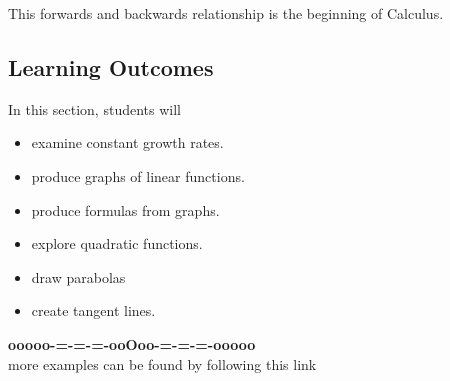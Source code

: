 \documentclass{ximera}
\begin{document}
This forwards and backwards relationship is the beginning of Calculus.





























\subsection*{Learning Outcomes}



\begin{sectionOutcomes}
In this section, students will 

\begin{itemize}
\item examine constant growth rates.
\item produce graphs of linear functions.
\item produce formulas from graphs.
\item explore quadratic functions.
\item draw parabolas
\item create tangent lines.
\end{itemize}
\end{sectionOutcomes}




















\begin{onlineOnly}
\begin{center}
\textbf{\textcolor{green!50!black}{ooooo-=-=-=-ooOoo-=-=-=-ooooo}} \\

more examples can be found by following this link\\ 

\end{center}
\end{onlineOnly}
\end{document}
